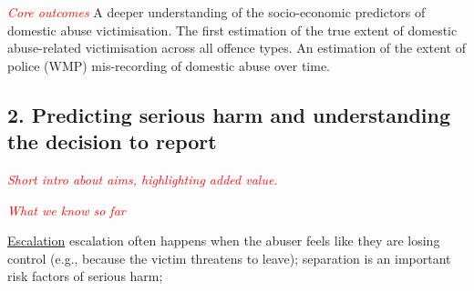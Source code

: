 \documentclass[11pt, a4paper]{article}
\begin{document}







\textcolor{red}{\textit{Core outcomes}} 
A deeper understanding of the socio-economic predictors of domestic abuse victimisation. The first estimation of the true extent of domestic abuse-related victimisation across all offence types. An estimation of the extent of police (WMP) mis-recording of domestic abuse over time. 

\newpage


\subsection*{2. Predicting serious harm and understanding the decision to report}


 \textcolor{red}{\textit{Short intro about aims, highlighting added value.}}


\textcolor{red}{\textit{What we know so far}}

\href{https://www.thehotline.org/2018/09/28/escalation/}{Escalation} escalation often happens when the abuser feels like they are losing control (e.g., because the victim threatens to leave); separation is an important risk factors of serious harm;
\end{document}
